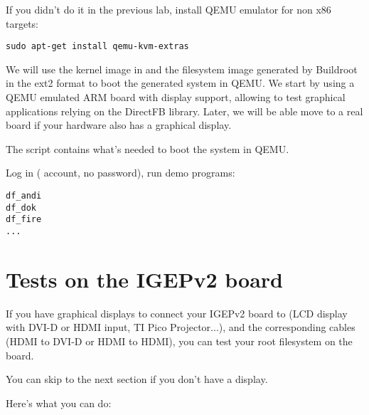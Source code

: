 If you didn't do it in the previous lab, install QEMU emulator for non
x86 targets:

\begin{verbatim}
sudo apt-get install qemu-kvm-extras
\end{verbatim}

We will use the kernel image in  and the filesystem image
generated by Buildroot in the ext2 format to boot the generated system
in QEMU. We start by using a QEMU emulated ARM board with display
support, allowing to test graphical applications relying on the
DirectFB library. Later, we will be able move to a real board if your
hardware also has a graphical display.

The  script contains what's needed to boot the system
in QEMU.

Log in ( account, no password), run demo programs:

\begin{verbatim}
df_andi
df_dok
df_fire
...
\end{verbatim}

\section{Tests on the IGEPv2 board}

If you have graphical displays to connect your IGEPv2 board to (LCD
display with DVI-D or HDMI input, TI Pico Projector...), and the
corresponding cables (HDMI to DVI-D or HDMI to HDMI), you can test
your root filesystem on the board.

You can skip to the next section if you don't have a display.

Here's what you can do:


